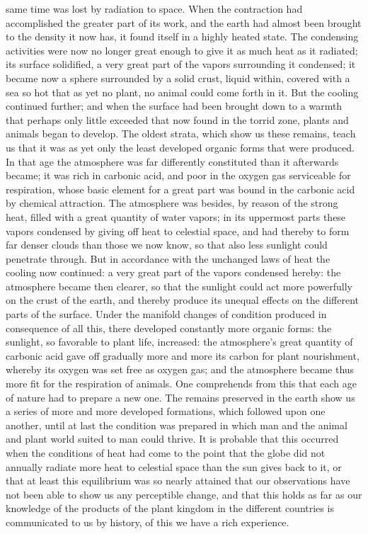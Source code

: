 \documentclass[12pt,a4paper,openany]{book}
\newcommand{\opage}[1]{\marginnote{\footnotesize\textit{[#1]}}}
\begin{document}
same time was lost by radiation to space. When the contraction had accomplished the
greater part of its work, and the earth had almost been brought to the density it
now has, it found itself in a highly heated state. The condensing activities were
now no longer great enough to give it as much heat as it radiated; its surface
solidified, a very great part of the vapors surrounding it condensed; it became now
a sphere surrounded by a solid crust, liquid within, covered with a sea so hot that
as yet no plant, no animal could come forth in it. But the cooling continued
further; and when the surface had been brought down to a warmth that perhaps only
little exceeded that now found in the torrid zone, plants and animals began to
develop. The oldest strata, which show us these remains, teach us that it was as yet
only the least developed organic forms that were produced. In that age the
atmosphere was far differently constituted than it afterwards became; it was rich in
carbonic acid, and poor in the oxygen gas serviceable for respiration, whose basic
element for a great part was bound in the carbonic acid by chemical attraction. The
atmosphere was besides, by reason of the strong heat, filled with a great quantity
of water vapors; in its uppermost parts these vapors condensed by giving off heat to
celestial space, and had thereby to form far denser clouds than those we now know,
so that also less sunlight could penetrate through. But in accordance with the
unchanged laws of heat the cooling now continued: a very great part of the vapors
condensed hereby: the atmosphere became then clearer, so that the sunlight could act
more powerfully on the crust of the earth, and thereby produce its unequal
\setcounter{footnote}{0}%
\opage{76}effects on the different parts of the surface. Under the manifold changes of
condition produced in consequence of all this, there developed constantly more
organic forms: the sunlight, so favorable to plant life, increased: the atmosphere's
great quantity of carbonic acid gave off gradually more and more its carbon for
plant nourishment, whereby its oxygen was set free as oxygen gas; and the atmosphere
became thus more fit for the respiration of animals. One comprehends from this that
each age of nature had to prepare a new one. The remains preserved in the earth show
us a series of more and more developed formations, which followed upon one another,
until at last the condition was prepared in which man and the animal and plant world
suited to man could thrive. It is probable that this occurred when the conditions of
heat had come to the point that the globe did not annually radiate more heat to
celestial space than the sun gives back to it, or that at least this equilibrium was
so nearly attained that our observations have not been able to show us any
perceptible change, and that this holds as far as our knowledge of the products of
the plant kingdom in the different countries is communicated to us by history, of
this we have a rich experience.
\end{document}
